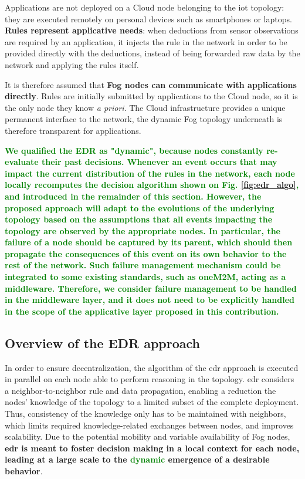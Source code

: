 \documentclass{iosart2c}
\newcommand{\edr}{EDR\xspace}
\newcommand{\added}[1]{\textcolor{green}{\textbf{#1}}}
\begin{document}
Applications are not deployed on a Cloud node belonging to the \gls{iot} topology: they are executed remotely on personal devices such as smartphones or laptops.
\textbf{Rules represent applicative needs}: when deductions from sensor observations are required by an application, it injects the rule in the network in order to be provided directly with the deductions, instead of being forwarded raw data by the network and applying the rules itself.

It is therefore assumed that \textbf{Fog nodes can communicate with applications directly}.
Rules are initially submitted by applications to the Cloud node, so it is the only node they know \textit{a priori}. 
The Cloud infrastructure provides a unique permanent interface to the network, the dynamic Fog topology underneath is therefore transparent for applications.

\added{We qualified the \edr as "dynamic", because nodes constantly re-evaluate their past decisions. 
Whenever an event occurs that may impact the current distribution of the rules in the network, each node locally recomputes the decision algorithm shown on Fig. \ref{fig:edr_algo}, and introduced in the remainder of this section.
However, the proposed approach will adapt to the evolutions of the underlying topology based on the assumptions that all events impacting the topology are observed by the appropriate nodes.
In particular, the failure of a node should be captured by its parent, which should then propagate the consequences of this event on its own behavior to the rest of the network.
Such failure management mechanism could be integrated to some existing standards, such as oneM2M, acting as a middleware.
Therefore, we consider failure management to be handled in the middleware layer, and it does not need to be explicitly handled in the scope of the applicative layer proposed in this contribution.
}

\subsection{Overview of the EDR approach}
\label{subs:edr_overview}

In order to ensure decentralization, the algorithm of the \gls{edr} approach is executed in parallel on each node able to perform reasoning in the topology. 
\gls{edr} considers a neighbor-to-neighbor rule and data propagation, enabling a reduction the nodes' knowledge of the topology to a limited subset of the complete deployment. 
Thus, consistency of the knowledge only has to be maintained with neighbors, which limits required knowledge-related exchanges between nodes, and improves scalability.
Due to the potential mobility and variable availability of Fog nodes, \textbf{\gls{edr} is meant to foster decision making in a local context for each node, leading at a large scale to the \added{dynamic} emergence of a desirable behavior}.
\end{document}
